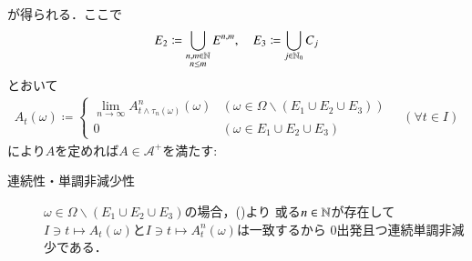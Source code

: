 \begin{prf}
\begin{description}
				が得られる．ここで
				\begin{align}
					E_2 \coloneqq \bigcup_{\substack{n,m \in \mathbb{N} \\ n \leq m}} E^{n,m},
					\quad E_3 \coloneqq \bigcup_{j \in \mathbb{N}_0} C_j
				\end{align}
				とおいて
				\begin{align}
					A_t(\omega) \coloneqq
					\begin{cases}
						\lim_{n \to \infty} A_{t \wedge \tau_n(\omega)}^n(\omega) & (\omega \in \Omega \backslash (E_1 \cup E_2 \cup E_3)) \\
						0 & (\omega \in E_1 \cup E_2 \cup E_3)
					\end{cases}
					\quad (\forall t \in I)
				\end{align}
				により$A$を定めれば$A \in \mathcal{A}^+$を満たす:
				\begin{description}
					\item[連続性・単調非減少性]
						$\omega \in \Omega \backslash (E_1 \cup E_2 \cup E_3)$の場合，()より
						或る$n \in \mathbb{N}$が存在して
						$I \ni t \longmapsto A_t(\omega)$と$I \ni t \longmapsto A_t^n(\omega)$は一致するから
						0出発且つ連続単調非減少である．
						

\end{description}
\end{description}
\end{prf}
